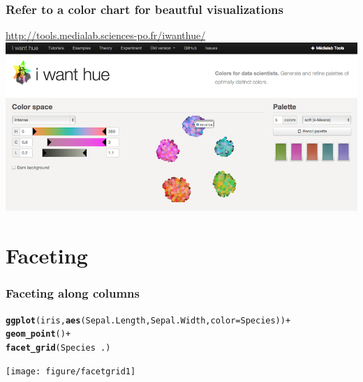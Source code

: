 \documentclass{beamer}\usepackage[]{graphicx}\usepackage[]{color}
\makeatletter
\newcommand{\hlkwd}[1]{\textcolor[rgb]{0.737,0.353,0.396}{\textbf{#1}}}%
\newenvironment{kframe}{%
 \def\at@end@of@kframe{}%
 \ifinner\ifhmode%
  \def\at@end@of@kframe{\end{minipage}}%
  \begin{minipage}{\columnwidth}%
 \fi\fi%
 \def\FrameCommand##1{\hskip\@totalleftmargin \hskip-\fboxsep
 \colorbox{shadecolor}{##1}\hskip-\fboxsep
     \hskip-\linewidth \hskip-\@totalleftmargin \hskip\columnwidth}%
 \MakeFramed {\advance\hsize-\width
   \@totalleftmargin\z@ \linewidth\hsize
   \@setminipage}}%
 {\par\unskip\endMakeFramed%
 \at@end@of@kframe}
\newenvironment{knitrout}{}{} %
\makeatother
\begin{document}
\begin{frame}[fragile]
\frametitle{Refer to a color chart for beautful visualizations}
\begin{center}
\url{http://tools.medialab.sciences-po.fr/iwanthue/}
\newline
\newline
\includegraphics[scale=0.25]{images/color_schemes.png}
\end{center}
\end{frame}


\section*{Faceting}
\frame{\sectionpage}


\begin{frame}[fragile]
\frametitle{Faceting along columns}
\begin{knitrout}\footnotesize
{}\color{fgcolor}\begin{kframe}
\begin{alltt}
\hlkwd{ggplot}(iris, \hlkwd{aes}(Sepal.Length, Sepal.Width, color = Species)) +
\hlkwd{geom_point}() +
\hlkwd{facet_grid}(Species ~ .)
\end{alltt}
\end{kframe}

{\centering \texttt{[image: figure/facetgrid1]} 

}



\end{knitrout}

\end{frame}
\end{document}
